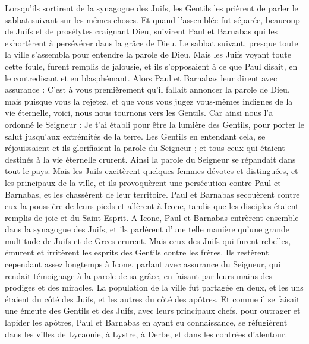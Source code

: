 \begin{multicols}{2}
Lorsqu’ils sortirent de la synagogue des Juifs, les Gentils les prièrent de parler le sabbat suivant sur les mêmes choses.
Et quand l'assemblée fut séparée, beaucoup de Juifs et de prosélytes craignant Dieu, suivirent Paul et Barnabas qui les exhortèrent à persévérer dans la grâce de Dieu.
Le sabbat suivant, presque toute la ville s'assembla pour entendre la parole de Dieu.
Mais les Juifs voyant toute cette foule, furent remplis de jalousie, et ils s’opposaient à ce que Paul disait, en le contredisant et en blasphémant.
Alors Paul et Barnabas leur dirent avec assurance : C’est à vous premièrement qu'il fallait annoncer la parole de Dieu, mais puisque vous la rejetez, et que vous vous jugez vous-mêmes indignes de la vie éternelle, voici, nous nous tournons vers les Gentils.
Car ainsi nous l’a ordonné le Seigneur : Je t'ai établi pour être la lumière des Gentils, pour porter le salut jusqu’aux extrémités de la terre.
Les Gentils en entendant cela, se réjouissaient et ils glorifiaient la parole du Seigneur ; et tous ceux qui étaient destinés à la vie éternelle crurent.
Ainsi la parole du Seigneur se répandait dans tout le pays.
Mais les Juifs excitèrent quelques femmes dévotes et distinguées, et les principaux de la ville, et ils provoquèrent une persécution contre Paul et Barnabas, et les chassèrent de leur territoire.
Paul et Barnabas secouèrent contre eux la poussière de leurs pieds et allèrent à Icone,
tandis que les disciples étaient remplis de joie et du Saint-Esprit.
\VerseOne{}A Icone, Paul et Barnabas entrèrent ensemble dans la synagogue des Juifs, et ils parlèrent d'une telle manière qu'une grande multitude de Juifs et de Grecs crurent.
Mais ceux des Juifs qui furent rebelles, émurent et irritèrent les esprits des Gentils contre les frères.
Ils restèrent cependant assez longtemps à Icone, parlant avec assurance du Seigneur, qui rendait témoignage à la parole de sa grâce, en faisant par leurs mains des prodiges et des miracles.
La population de la ville fut partagée en deux, et les uns étaient du côté des Juifs, et les autres du côté des apôtres.
Et comme il se faisait une émeute des Gentils et des Juifs, avec leurs principaux chefs, pour outrager et lapider les apôtres,
Paul et Barnabas en ayant eu connaissance, se réfugièrent dans les villes de Lycaonie, à Lystre, à Derbe, et dans les contrées d'alentour.

\end{multicols}
